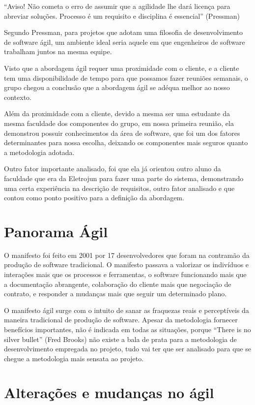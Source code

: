 “Aviso! Não cometa o erro de assumir que a agilidade lhe dará licença para abreviar soluções. Processo é um requisito e disciplina é essencial” (Pressman)
 
Segundo Pressman, para projetos que adotam uma filosofia de desenvolvimento de software ágil, um ambiente ideal seria aquele em que engenheiros de software trabalham juntos na mesma equipe.

Visto que a abordagem ágil requer uma proximidade com o cliente, e a cliente tem uma disponibilidade de tempo para que possamos fazer reuniões semanais, o grupo chegou a conclusão que a abordagem ágil se adéqua melhor ao nosso contexto.

Além da proximidade com a cliente, devido a mesma ser uma estudante da mesma faculdade dos componentes do grupo, em nossa primeira reunião, ela demonstrou possuir conhecimentos da área de software, que foi um dos fatores determinantes para nossa escolha, deixando os componentes mais seguros quanto a metodologia adotada.

Outro fator importante analisado, foi que ela já orientou outro aluno da faculdade que era da Eletrojun para fazer uma parte do sistema, demonstrando uma certa experiência na descrição de requisitos, outro fator analisado e que contou como ponto positivo para a definição da abordagem.

\section {Panorama Ágil}

O manifesto foi feito em 2001 por 17 desenvolvedores que foram na contramão da produção de software tradicional. O manifesto passava a valorizar os indivíduos e interações mais que os processos e ferramentas, o software funcionando mais que a documentação abrangente, colaboração do cliente mais que negociação de contrato, e responder a mudanças mais que seguir um determinado plano.

O manifesto ágil surge com o intuito de sanar as fraquezas  reais e perceptíveis da maneira tradicional de produção de software. Apesar da metodologia fornecer benefícios importantes, não é indicada em todas as situações, porque “There is no silver bullet” (Fred Brooks) não existe a bala de prata para a metodologia de desenvolvimento empregada no projeto, tudo vai ter que ser analisado para que se chegue a metodologia mais sensata ao projeto.

\section{Alterações e mudanças no ágil}

